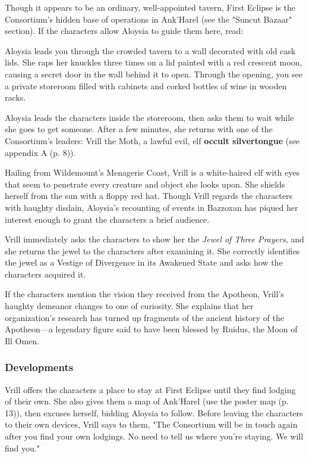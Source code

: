 \documentclass[a4paper, 11pt, bg=full, twocolumn, nooutline]{dndbook}
\begin{document}
Though it appears to be an ordinary, well-appointed tavern, First Eclipse is the Consortium's hidden base of operations in Ank'Harel (see the "Suncut Bazaar" section). If the characters allow Aloysia to guide them here, read:

\begin{DndReadAloud}
Aloysia leads you through the crowded tavern to a wall decorated with old cask lids. She raps her knuckles three times on a lid painted with a red crescent moon, causing a secret door in the wall behind it to open. Through the opening, you see a private storeroom filled with cabinets and corked bottles of wine in wooden racks.
\end{DndReadAloud}

Aloysia leads the characters inside the storeroom, then asks them to wait while she goes to get someone. After a few minutes, she returns with one of the Consortium's leaders: Vrill the Moth, a lawful evil, elf \textbf{occult silvertongue} (see appendix A (p. 8)).

Hailing from Wildemount's Menagerie Coast, Vrill is a white-haired elf with eyes that seem to penetrate every creature and object she looks upon. She shields herself from the sun with a floppy red hat. Though Vrill regards the characters with haughty disdain, Aloysia's recounting of events in Bazzoxan has piqued her interest enough to grant the characters a brief audience.

Vrill immediately asks the characters to show her the \textit{Jewel of Three Prayers}, and she returns the jewel to the characters after examining it. She correctly identifies the jewel as a Vestige of Divergence in its Awakened State and asks how the characters acquired it.

If the characters mention the vision they received from the Apotheon, Vrill's haughty demeanor changes to one of curiosity. She explains that her organization's research has turned up fragments of the ancient history of the Apotheon---a legendary figure said to have been blessed by Ruidus, the Moon of Ill Omen.

\subsubsection{Developments}

Vrill offers the characters a place to stay at First Eclipse until they find lodging of their own. She also gives them a map of Ank'Harel (use the poster map (p. 13)), then excuses herself, bidding Aloysia to follow. Before leaving the characters to their own devices, Vrill says to them, "The Consortium will be in touch again after you find your own lodgings. No need to tell us where you're staying. We will find you."
\end{document}
